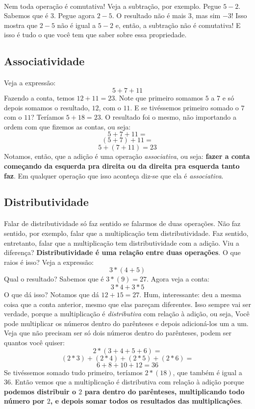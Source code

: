 \documentclass[12pt]{article}
\begin{document}
\paragraph{}
Nem toda operação é comutativa! Veja a 
subtração, por exemplo. Pegue $5 - 2$. Sabemos que é $3$. Pegue agora $2 - 5$.
O resultado não é mais $3$, mas sim $-3$! Isso mostra que $2 - 5$ não é igual a
$5 - 2$ e, então, a subtração não é comutativa!
E isso é tudo o que você tem que saber sobre essa propriedade.

\subsection{Associatividade}
\paragraph{}
Veja a expressão:
$$5 + 7 + 11$$
Fazendo a conta, temos $12 + 11 = 23$. Note que primeiro somamos $5$ a $7$ e 
só depois somamos o resultado, $12$, com o $11$. E se tivéssemos primeiro 
somado o $7$ com o $11$? Teríamos $5 + 18 = 23$. 
O resultado foi o mesmo, não importando a ordem com que fizemos as contas, 
ou seja:
$$5 + 7 + 11 =$$
$$(5 + 7) + 11 =$$
$$5 + (7 + 11) = 23$$
Notamos, então, que a adição é uma operação \textit{associativa}, ou seja:
\textbf{fazer a conta começando da esquerda pra direita ou da direita pra 
esquerda tanto faz}. Em qualquer operação que isso aconteça diz-se que ela é
\textit{associativa}.

\subsection{Distributividade}
\paragraph{}
Falar de distributividade só faz sentido se falarmos de duas operações. 
Não faz sentido, por exemplo, falar que a multiplicação tem distributividade.
Faz sentido, entretanto, falar que a multiplicação tem distributividade com
a adição. Viu a diferença? \textbf{Distributividade é uma relação entre duas
operações}.
O que raios é isso? Veja a expressão:
$$3*(4 + 5)$$
Qual o resultado? Sabemos que é $3*(9) = 27$. Agora veja a conta:
$$3*4 + 3*5$$
O que dá isso? Notamos que dá $12 + 15 = 27$. Hum, interessante: deu a mesma
coisa que a conta anterior, mesmo que elas pareçam diferentes. Isso sempre vai
ser verdade, porque a multiplicação é \textit{distributiva} com relação à 
adição, ou seja, Você pode multiplicar os números dentro do parênteses
e depois adicioná-los um a um. Veja que não precisam ser só dois números dentro
do parênteses, podem ser quantos você quiser:
$$2*(3 + 4 + 5 + 6) =$$
	$$(2*3) + (2*4) + (2*5) + (2*6)=$$
$$6 + 8 + 10 + 12 = 36$$
Se tivéssemos somado tudo primeiro, teríamos $2*(18)$, que também é igual a 
$36$. Então vemos que a multiplicação é distributiva com relação à adição porque
\textbf{podemos distribuir o $2$ para dentro do parênteses, multiplicando todo 
número por $2$, e depois somar todos os resultados das multiplicações}. 
\end{document}
